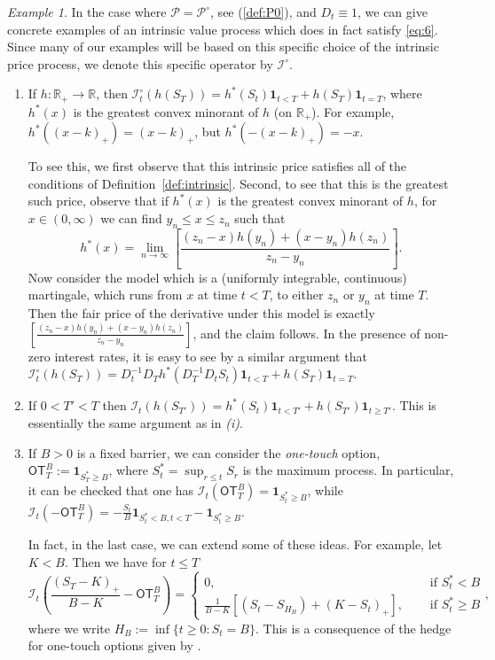 \documentclass[a4paper]{amsart}
\theoremstyle{definition}
\theoremstyle{remark}
\newtheorem{example}[theorem]{Example}
\numberwithin{equation}{section}
\newcommand{\R}{\mathbb{R}}
\newcommand{\ind}{\boldsymbol{1}}
\newcommand{\Pc}{\mathcal{P}}
\newcommand{\Pcc}{\Pc^{\circ}}
\newcommand{\In}{\mathcal{I}} %
\newcommand{\Inc}{\In^{\circ}} %
\newcommand{\OT}{\mathsf{OT}}
\begin{document}
\begin{example} \label{ex:Intrinsic}
  In the case where $\Pc = \Pcc$, see (\ref{def:P0}), and $D_t \equiv 1$, we can give concrete examples of an intrinsic value process which does in fact satisfy \eqref{eq:6}. Since many of our examples will be based on this specific choice of the intrinsic price process, we denote this specific operator by $\Inc$.
  \begin{enumerate}
  \item\label{item:1} If $h:\R_+ \to \R$, then $\Inc_t(h(S_T)) = h^*(S_t)\ind_{t<T}
    + h(S_T)\ind_{t=T}$, where $h^*(x)$ is the greatest convex minorant of $h$ (on $\R_+$). For example, $h^*((x-k)_+) = (x-k)_+$, but $h^*(-(x-k)_+) = -x$.

    To see this, we first observe that this intrinsic price satisfies all of the conditions of Definition~\ref{def:intrinsic}. Second, to see that this is the greatest such price, observe that if $h^*(x)$ is the greatest convex minorant of $h$, for $x \in (0,\infty)$ we can find $y_n \le x \le z_n$ such that \[h^*(x) = \lim_{n \to \infty} \left[ \frac{(z_n-x) h(y_n) + (x-y_n)h(z_n)}{z_n-y_n}\right].\]
Now consider the model which is a (uniformly integrable, continuous) martingale, which runs from $x$ at time $t<T$, to either $z_n$ or $y_n$ at time $T$. Then the fair price of the derivative under this model is exactly $ \left[ \frac{(z_n-x) h(y_n) + (x-y_n)h(z_n)}{z_n-y_n}\right]$, and the claim follows. In the presence of non-zero interest rates, it is easy to see by a similar argument that $\Inc_t(h(S_T)) = D_t^{-1} D_Th^*( D_T^{-1} D_tS_t)\ind_{t<T}
    + h(S_T)\ind_{t=T}$.
  \item\label{item:2} If $0 < T' < T$ then $\In_t(h(S_{T'})) = h^*(S_t) \ind_{t < T'} + h(S_{T'}) \ind_{t \ge T'}$. This is essentially the same argument as  in  \emph{(i)}.
  \item\label{item:3} If $B >0$ is a fixed barrier, we can consider the
    \emph{one-touch} option, $\OT^B_T := \ind_{S_T^* \ge B}$, where
    $S_t^* = \sup_{r \le t} S_r$ is the maximum process. In
    particular, it can be checked that one has $\In_t(\OT_T^B) =
    \ind_{S_t^* \ge B}$, while $\In_t(-\OT_T^B) = -\frac{S_t}{B}
    \ind_{S_t^* < B, t<T} - \ind_{S_t^* \ge B}$.

    In fact, in the last case, we can extend some of these ideas. For example, let $K<B$. Then we have for $t \le T$
    \begin{equation*}
      \In_t\left(\frac{(S_T-K)_+}{B-K} - \OT_T^B\right) =
      \begin{cases}
        0, &\quad \text{ if } S_t^* < B\\
        \frac{1}{B-K} \left[ (S_t - S_{H_B}) + (K-S_t)_+\right], & \quad \text{ if } S_t^* \ge B
      \end{cases},
    \end{equation*}
    where we write $H_B := \inf \{ t \ge 0: S_t = B\}$.  This is a consequence of the hedge for one-touch options given by \cite{Hobson:1998aa}.


\end{enumerate}
\end{example}
\end{document}
